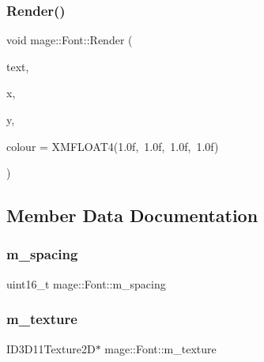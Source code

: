 \hypertarget{classmage_1_1_font_a1be5ae8a4da06d84081fde478df7fd0e}{}\label{classmage_1_1_font_a1be5ae8a4da06d84081fde478df7fd0e} 
\subsubsection{\texorpdfstring{Render()}{Render()}}
{\footnotesize\ttfamily void mage\+::\+Font\+::\+Render (\begin{DoxyParamCaption}\item[{char $\ast$}]{text,  }\item[{float}]{x,  }\item[{float}]{y,  }\item[{X\+M\+F\+L\+O\+A\+T4}]{colour = {\ttfamily XMFLOAT4(1.0f,~1.0f,~1.0f,~1.0f)} }\end{DoxyParamCaption})}



\subsection{Member Data Documentation}
\hypertarget{classmage_1_1_font_adf5b07b3d91d4dc84e92c3e997ec3d13}{}\label{classmage_1_1_font_adf5b07b3d91d4dc84e92c3e997ec3d13} 
\subsubsection{\texorpdfstring{m\+\_\+spacing}{m\_spacing}}
{\footnotesize\ttfamily uint16\+\_\+t mage\+::\+Font\+::m\+\_\+spacing\hspace{0.3cm}{\ttfamily [private]}}

\hypertarget{classmage_1_1_font_a4ccec8d9d3e29b3ef307b8111084c9b8}{}\label{classmage_1_1_font_a4ccec8d9d3e29b3ef307b8111084c9b8} 
\subsubsection{\texorpdfstring{m\+\_\+texture}{m\_texture}}
{\footnotesize\ttfamily I\+D3\+D11\+Texture2D$\ast$ mage\+::\+Font\+::m\+\_\+texture\hspace{0.3cm}{\ttfamily [private]}}

